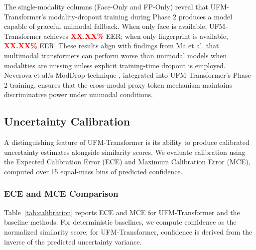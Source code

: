 \documentclass[10pt,journal,compsoc]{IEEEtran}
\begin{document}
The single-modality columns (Face-Only and FP-Only) reveal that UFM-Transformer's modality-dropout training during Phase 2 produces a model capable of graceful unimodal fallback. When only face is available, UFM-Transformer achieves \textcolor{red}{\textbf{XX.XX\%}} EER; %
when only fingerprint is available, \textcolor{red}{\textbf{XX.XX\%}} EER. %
These results align with findings from Ma et al. \cite{ma2022missing} that multimodal transformers can perform worse than unimodal models when modalities are missing unless explicit training-time dropout is employed. Neverova et al.'s ModDrop technique \cite{neverova2016moddrop}, integrated into UFM-Transformer's Phase 2 training, ensures that the cross-modal proxy token mechanism maintains discriminative power under unimodal conditions.

\subsection{Uncertainty Calibration}
\label{subsec:calibration}

A distinguishing feature of UFM-Transformer is its ability to produce calibrated uncertainty estimates alongside similarity scores. We evaluate calibration using the Expected Calibration Error (ECE) and Maximum Calibration Error (MCE), computed over 15 equal-mass bins of predicted confidence.

\subsubsection{ECE and MCE Comparison} Table~\ref{tab:calibration} reports ECE and MCE for UFM-Transformer and the baseline methods. For deterministic baselines, we compute confidence as the normalized similarity score; for UFM-Transformer, confidence is derived from the inverse of the predicted uncertainty variance.
\end{document}
